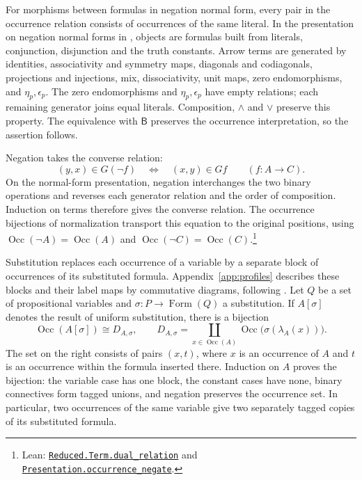 \documentclass[11pt]{article}
\newcommand{\B}{\mathsf B}
\newcommand{\Occ}{\operatorname{Occ}}
\newcommand{\FormulaSet}{\operatorname{Form}}
\begin{document}
For morphisms between formulas in negation normal form, every pair in
the occurrence relation consists of occurrences of the same literal.
In the presentation on negation normal forms in
\cite[\S14.2, pp.~318--321]{DP}, objects are formulas built from
literals, conjunction, disjunction and the truth constants.
Arrow terms are generated by identities, associativity and symmetry
maps, diagonals and codiagonals, projections and injections, mix,
dissociativity, unit maps, zero endomorphisms, and $\eta_p,\epsilon_p$.
The zero endomorphisms and $\eta_p,\epsilon_p$ have empty relations;
each remaining generator joins equal literals.
Composition, $\wedge$ and $\vee$ preserve this property.
The equivalence with $\B$ preserves the occurrence interpretation,
so the assertion follows.

Negation takes the converse relation:
\[
 (y,x)\in G(\neg f)\quad\Longleftrightarrow\quad(x,y)\in Gf
 \qquad(f:A\to C).
\]
On the normal-form presentation, negation interchanges the two
binary operations and reverses each generator relation and the
order of composition. Induction on terms therefore gives the
converse relation. The occurrence bijections of normalization
transport this equation to the original positions, using
$\Occ(\neg A)=\Occ(A)$ and $\Occ(\neg C)=\Occ(C)$.\footnote{\raggedright Lean:
\href{https://github.com/flengyel/Dosen-Petric-Maximality/blob/5dbee39bea09539bd130f729e82636419f71f920/DosenPetric/ReducedDualRelations.lean\#L20}{\texttt{Reduced.Term.\allowbreak{}dual\_relation}} and
\href{https://github.com/flengyel/Dosen-Petric-Maximality/blob/5dbee39bea09539bd130f729e82636419f71f920/DosenPetric/PresentationNegationOccurrence.lean\#L25}{\texttt{Presentation.\allowbreak{}occurrence\_negate}}.}

Substitution replaces each occurrence of a variable by a separate
block of occurrences of its substituted formula.
Appendix~\ref{app:profiles} describes these blocks and their label maps
by commutative diagrams, following \cite[\S9]{Notation}.
Let $Q$ be a set of propositional variables and
$\sigma:P\to\FormulaSet(Q)$ a substitution. If $A[\sigma]$ denotes the
result of uniform substitution, there is a bijection
\begin{equation}
 \Occ(A[\sigma])\cong D_{A,\sigma},\qquad
 D_{A,\sigma}=\coprod_{x\in\Occ(A)}
                  \Occ\bigl(\sigma(\lambda_A(x))\bigr).
 \label{eq:occ-substitution}
\end{equation}
The set on the right consists of pairs $(x,t)$, where $x$ is an
occurrence of $A$ and $t$ is an occurrence within the formula inserted there.
Induction on $A$ proves the bijection: the variable case has one
block, the constant cases have none, binary connectives form tagged
unions, and negation preserves the occurrence set. In particular,
two occurrences of the same variable give two separately tagged
copies of its substituted formula.
\end{document}
